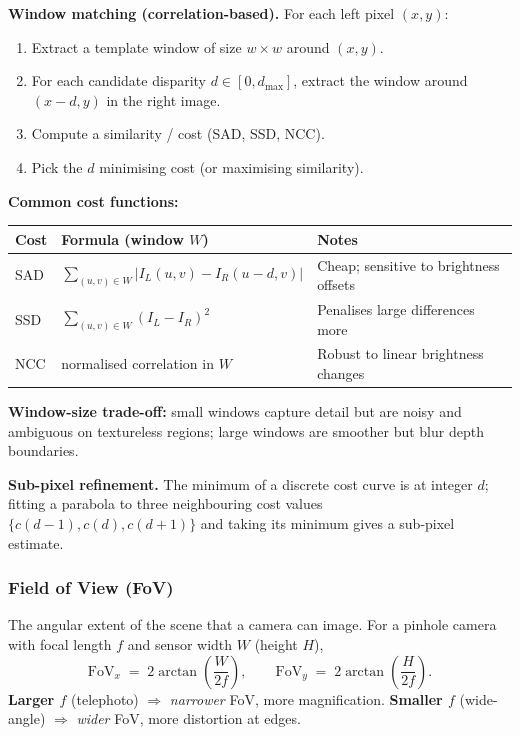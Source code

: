 \separator

\textbf{Window matching (correlation-based).} For each left pixel $(x,y)$:
\begin{enumerate}
  \item Extract a template window of size $w \times w$ around $(x,y)$.
  \item For each candidate disparity $d \in [0, d_{\max}]$, extract the window around $(x-d, y)$ in the right image.
  \item Compute a similarity / cost (SAD, SSD, NCC).
  \item Pick the $d$ minimising cost (or maximising similarity).
\end{enumerate}
\textbf{Common cost functions:}
\begin{center}
\renewcommand{\arraystretch}{1.3}
\begin{tabular}{@{} l l p{6cm} @{}}
\toprule
\textbf{Cost} & \textbf{Formula (window $W$)} & \textbf{Notes} \\
\midrule
SAD & $\sum_{(u,v)\in W} |I_L(u,v) - I_R(u-d,v)|$ & Cheap; sensitive to brightness offsets \\
SSD & $\sum_{(u,v)\in W} (I_L - I_R)^2$ & Penalises large differences more \\
NCC & normalised correlation in $W$ & Robust to linear brightness changes \\
\bottomrule
\end{tabular}
\end{center}
\textbf{Window-size trade-off:} small windows capture detail but are noisy and ambiguous on textureless regions; large windows are smoother but blur depth boundaries.

\textbf{Sub-pixel refinement.} The minimum of a discrete cost curve is at integer $d$; fitting a parabola to three neighbouring cost values $\{c(d-1), c(d), c(d+1)\}$ and taking its minimum gives a sub-pixel estimate.

\bigseparator

\subsubsection{Field of View (FoV)}

\begin{defbox}
The angular extent of the scene that a camera can image. For a pinhole camera with focal length $f$ and sensor width $W$ (height $H$),
\[
\text{FoV}_x \;=\; 2 \arctan\!\left(\frac{W}{2 f}\right), \qquad \text{FoV}_y \;=\; 2 \arctan\!\left(\frac{H}{2 f}\right).
\]
\textbf{Larger $f$} (telephoto) $\Rightarrow$ \emph{narrower} FoV, more magnification.
\textbf{Smaller $f$} (wide-angle) $\Rightarrow$ \emph{wider} FoV, more distortion at edges.
\end{defbox}

